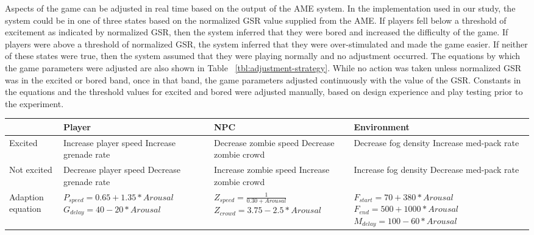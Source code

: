 Aspects of the game can be adjusted in real time based on the output of the AME system. In the implementation used in our study, the system could be in one of three states based on the normalized GSR value supplied from the AME. If players fell below a threshold of excitement as indicated by normalized GSR, then the system inferred that they were bored and increased the difficulty of the game. If players were above a threshold of normalized GSR, the system inferred that they were over-stimulated and made the game easier. If neither of these states were true, then the system assumed that they were playing normally and no adjustment occurred. The equations by which the game parameters were adjusted are also shown in Table ~\ref{tbl:adjustment-strategy}. While no action was taken unless normalized GSR was in the excited or bored band, once in that band, the game parameters adjusted continuously with the value of the GSR. Constants in the equations and the threshold values for excited and bored were adjusted manually, based on design experience and play testing prior to the experiment.

\begin{table*}[!t]
\caption{Adjustment Strategy}
\label{tbl:adjustment-strategy}
\hfil
\centering
\begin{tabular}{lp{4cm}p{4cm}p{4cm}}
                     & Player                            & NPC                             & Environment \\
\hline
Excited              & Increase player speed \newline Increase grenade rate
                     & Decrease zombie speed \newline Decrease zombie crowd
                     & Decrease fog density \newline Increase med-pack rate  \\
\hline
Not excited          & Decrease player speed \newline Decrease grenade rate
                     & Increase zombie speed \newline Increase zombie crowd
                     & Increase fog density \newline Decrease med-pack rate  \\
\hline
Adaption \newline
equation             & $P_{speed} = 0.65 + 1.35 * Arousal$    \newline $G_{delay} = 40 - 20 * Arousal$
                     & $Z_{speed} = \frac{1}{0.30 + Arousal}$ \newline $Z_{crowd} = 3.75 - 2.5 * Arousal$
                     & $F_{start} = 70 + 380 * Arousal$       \newline $F_{end} = 500 + 1000 * Arousal$ \newline $M_{delay} = 100 - 60 * Arousal$ \\
\end{tabular}
\end{table*}


